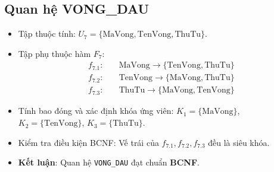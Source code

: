 \subsection{Quan hệ VONG\_DAU}
\begin{itemize}
    \item Tập thuộc tính: $U_7 = \{\text{MaVong}, \text{TenVong}, \text{ThuTu}\}$.
    \item Tập phụ thuộc hàm $F_7$:
    \begin{align*}
        f_{7.1}: & \quad \text{MaVong} \rightarrow \{\text{TenVong}, \text{ThuTu}\} \\
        f_{7.2}: & \quad \text{TenVong} \rightarrow \{\text{MaVong}, \text{ThuTu}\} \\
        f_{7.3}: & \quad \text{ThuTu} \rightarrow \{\text{MaVong}, \text{TenVong}\}
    \end{align*}
    \item Tính bao đóng và xác định khóa ứng viên: $K_1 = \{\text{MaVong}\}$, $K_2 = \{\text{TenVong}\}$, $K_3 = \{\text{ThuTu}\}$.
    \item Kiểm tra điều kiện BCNF: Vế trái của $f_{7.1}, f_{7.2}, f_{7.3}$ đều là siêu khóa.
    \item \textbf{Kết luận}: Quan hệ \texttt{VONG\_DAU} đạt chuẩn \textbf{BCNF}.
\end{itemize}

